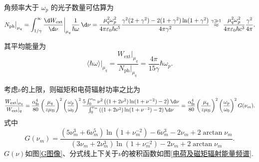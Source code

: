 角频率大于 \(\omega_{p}\) 的光子数量可估算为
\begin{equation*}
	N_{\mathrm{ph}}\big|_{\mu_q} = \int_{1/\gamma}^{\infty} \frac{\d  W_{\mathrm{ext}}}{\d \nu}\bigg|_{\mu_q} \frac{1}{\hbar \omega} \, \d \nu = \frac{\mu_{q}^{2} \omega_{p}^{2}}{4\pi \varepsilon_{0} \hbar c^{5}} \frac{\gamma^{2} (2 + \gamma^{2}) - 2(1 + \gamma^{2}) \ln(1 + \gamma^{2})}{4\pi \gamma^{2}} \overset{\gamma \gg 1}{\approx} \frac{\mu_{q}^{2} \omega_{p}^{2}}{4\pi \varepsilon_{0} \hbar c^{3}} \frac{\gamma^{2}}{4\pi}.
\end{equation*}

其平均能量为
\begin{equation*}
	\langle \hbar\omega \rangle\big|_{\mu_q} = \frac{W_{\mathrm{ext}}|_{\mu_q}}{N_{\mathrm{ph}}|_{\mu_q}} = \frac{4\pi}{15 \gamma} \hbar\omega_{p}.
\end{equation*}

考虑\(\nu\)的上限，则磁矩和电荷辐射功率之比为
\begin{equation*}
	\frac{W_{\mathrm{ext}}|_{\mu_{q}}}{W_{\mathrm{ext}}|_{q}} = \frac{\alpha_{\mathrm{fs}}^{4}}{80} \left( \frac{\mu_{q}}{z \mu_{\mathrm{B}}} \right)^{2} \left( \frac{\omega_{p}}{\omega_{0}} \right)^{2} \frac{5 \int_{0}^{\nu_{m}} \nu^{2} \left( (1 + 2\nu^{2}) \ln(1 + \nu^{-2}) - 2 \right) \d \nu}{\int_{0}^{\nu_{m}} \left( (1 + 2\nu^{2}) \ln(1 + \nu^{-2}) - 2 \right) \d \nu} = \frac{\alpha_{\mathrm{fs}}^{4}}{80} \left( \frac{\mu_{q}}{z \mu_{\mathrm{B}}} \right)^{2} \left( \frac{\omega_{p}}{\omega_{0}} \right)^{2} G(\nu_{m}).
\end{equation*}
式中
\begin{equation*}
	G(\nu_{m}) = \frac{(5\nu_{m}^{3} + 6\nu_{m}^{5}) \ln(1 + \nu_{m}^{-2}) - 6\nu_{m}^{3} - 2\nu_{m} + 2 \arctan\nu_{m}}{(3\nu_{m} + 2\nu_{m}^{3}) \ln(1 + \nu_{m}^{-2}) - 2\nu_{m} + 2 \arctan\nu_{m}}.
\end{equation*}
\(G(\nu)\)如图\ref{G图像}、分式线上下关于\(\nu\)的被积函数如图\ref{电荷及磁矩辐射能量频谱}.


